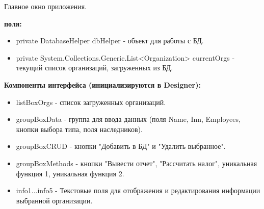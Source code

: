 \documentclass[oneside,a4paper,14pt]{extarticle}
\begin{document}
Главное окно приложения.

\textbf{поля:}
\begin{itemize}
    \item private DatabaseHelper dbHelper - объект для работы с БД.
    \item private System.Collections.Generic.List<Organization> currentOrgs - текущий список организаций, загруженных из БД.
\end{itemize}

\textbf{Компоненты интерфейса (инициализируются в Designer):}
\begin{itemize}
    \item listBoxOrgs - список загруженных организаций.
    \item groupBoxData - группа для ввода данных (поля Name, Inn, Employees, кнопки выбора типа, поля наследников).
    \item groupBoxCRUD - кнопки "Добавить в БД" и "Удалить выбранное".
    \item groupBoxMethods - кнопки "Вывести отчет", "Рассчитать налог", уникальная функция 1, уникальная функция 2.
    \item info1...info5 - Текстовые поля для отображения и редактирования информации выбранной организации.
\end{itemize}
\end{document}
